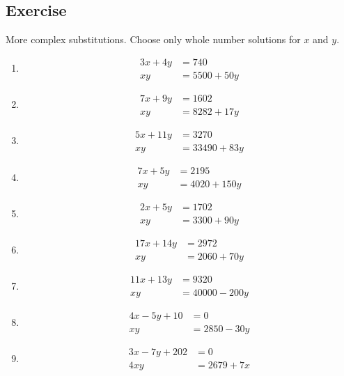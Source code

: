 \documentclass[a4paper,11pt]{article}
\begin{document}
\subsection{Exercise}\label{ex7}
More complex substitutions. Choose only whole number solutions for $x$ and $y$.
\begin{multicols}{3}
\begin{enumerate}
\item\begin{align*}
3x+4y&=740\\
xy&=5500+50y
\end{align*} 
\item\begin{align*}
7x+9y&=1602\\
xy&=8282+17y
\end{align*}
\item\begin{align*}
5x+11y&=3270\\
xy&=33490+83y
\end{align*}
\item\begin{align*}
7x+5y&=2195\\
xy&=4020+150y
\end{align*}
\item\begin{align*}
2x+5y&=1702\\
xy&=3300+90y
\end{align*}
\item\begin{align*}
17x+14y&=2972\\
xy&=2060+70y
\end{align*}
\item\begin{align*}
11x+13y&=9320\\
xy&=40000-200y
\end{align*} 
\item\begin{align*}
4x-5y+10&=0\\
xy&=2850-30y
\end{align*}
\item\begin{align*}
3x-7y+202&=0\\
4xy&=2679+7x
\end{align*}     
\end{enumerate}
\end{multicols}
\newpage
\end{document}
